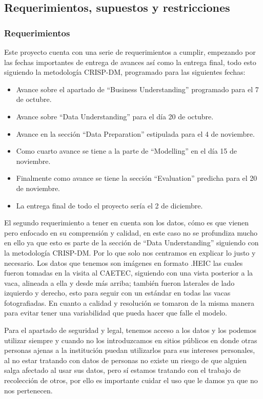 \subsection{Requerimientos, supuestos y restricciones}

\subsubsection{Requerimientos}

Este proyecto cuenta con una serie de requerimientos a cumplir, empezando por las fechas importantes de entrega de avances así como la entrega final, todo esto siguiendo la metodología CRISP-DM, programado para las siguientes fechas:

\begin{itemize}
  \item Avance sobre el apartado de ``Business Understanding'' programado para el 7 de octubre.
  \item Avance sobre ``Data Understanding'' para el día 20 de octubre.
  \item Avance en la sección ``Data Preparation'' estipulada para el 4 de noviembre.
  \item Como cuarto avance se tiene a la parte de ``Modelling'' en el día 15 de noviembre.
  \item Finalmente como avance se tiene la sección ``Evaluation'' predicha para el 20 de noviembre.
  \item La entrega final de todo el proyecto sería el 2 de diciembre.
\end{itemize}

El segundo requerimiento a tener en cuenta son los datos, cómo es que vienen pero enfocado en su comprensión y calidad, en este caso no se profundiza mucho en ello ya que esto es parte de la sección de ``Data Understanding'' siguiendo con la metodología CRISP-DM. Por lo que solo nos centramos en explicar lo justo y necesario. Los datos que tenemos son imágenes en formato .HEIC las cuales fueron tomadas en la visita al CAETEC, siguiendo con una vista posterior a la vaca, alineada a ella y desde más arriba; también fueron laterales de lado izquierdo y derecho, esto para seguir con un estándar en todas las vacas fotografiadas. En cuanto a calidad y resolución se tomaron de la misma manera para evitar tener una variabilidad que pueda hacer que falle el modelo.

Para el apartado de seguridad y legal, tenemos acceso a los datos y los podemos utilizar siempre y cuando no los introduzcamos en sitios públicos en donde otras personas ajenas a la institución puedan utilizarlos para sus intereses personales, al no estar tratando con datos de personas no existe un riesgo de que alguien salga afectado al usar sus datos, pero sí estamos tratando con el trabajo de recolección de otros, por ello es importante cuidar el uso que le damos ya que no nos pertenecen.

